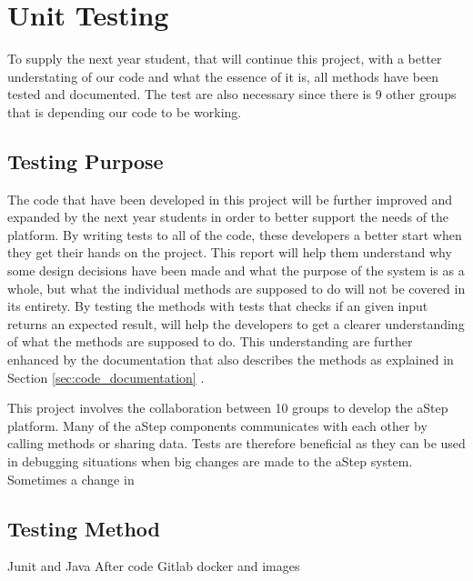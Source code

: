 \section{Unit Testing}
To supply the next year student, that will continue this project, with a better understating of our code and what the essence of it is, all methods have been tested and documented. 
The test are also necessary since there is 9 other groups that is depending our code to be working.

\subsection{Testing Purpose}
The code that have been developed in this project will be further improved and expanded by the next year students in order to better support the needs of the platform. 
By writing tests to all of the code, these developers a better start when they get their hands on the project. 
This report will help them understand why some design decisions have been made and what the purpose of the system is as a whole, but what the individual methods are supposed to do will not be covered in its entirety. 
By testing the methods with tests that checks if an given input returns an expected result, will help the developers to get a clearer understanding of what the methods are supposed to do. 
This understanding are further enhanced by the documentation that also describes the methods as explained in Section \ref{sec:code_documentation} . 

This project involves the collaboration between 10 groups to develop the aStep platform. 
Many of the aStep components communicates with each other by calling methods or sharing data.
Tests are therefore beneficial as they can be used in debugging situations when big changes are made to the aStep system. 
Sometimes a change in 





\subsection{Testing Method}
Junit and Java
After code
Gitlab docker and images

